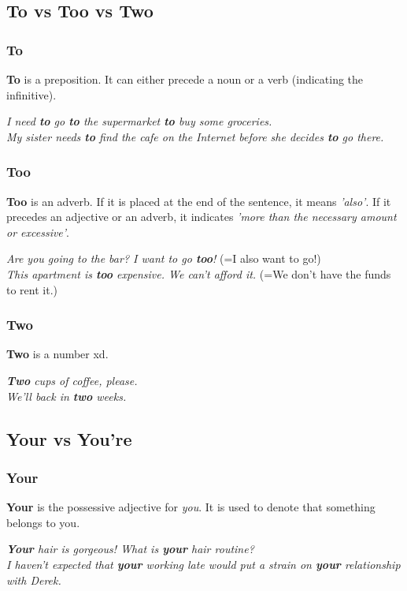 \documentclass[hidelinks,10pt,a4paper]{article}
\begin{document}
\subsection{To vs Too vs Two}
\subsubsection{To}
\textbf{To} is a preposition. It can either precede a noun or a verb (indicating the infinitive).
\begin{center}
	\textit{I need \textbf{to} go \textbf{to} the supermarket \textbf{to} buy some groceries.}\\
	\textit{My sister needs \textbf{to} find the cafe on the Internet before she decides \textbf{to} go there.}
\end{center}

\subsubsection{Too}
\textbf{Too} is an adverb. If it is placed at the end of the sentence, it means \textit{'also'}. If it precedes an adjective or an adverb, it indicates \textit{'more than the necessary amount or excessive'}.

\begin{center}
	\textit{Are you going to the bar? I want to go \textbf{too}!} (=I also want to go!)\\
	\textit{This apartment is \textbf{too} expensive. We can't afford it.} (=We don't have the funds to rent it.)
\end{center}

\subsubsection{Two}
\textbf{Two} is a number xd.
\begin{center}
	\textit{\textbf{Two} cups of coffee, please.}\\
	\textit{We'll back in \textbf{two} weeks.}
\end{center}

\subsection{Your vs You're}
\subsubsection{Your}
\textbf{Your} is the possessive adjective for \textit{you}. It is used to denote that something belongs to you.
\begin{center}
	\textit{\textbf{Your} hair is gorgeous! What is \textbf{your} hair routine?}\\
	\textit{I haven't expected that \textbf{your} working late would put a strain on \textbf{your} relationship with Derek.}
\end{center}
\end{document}
